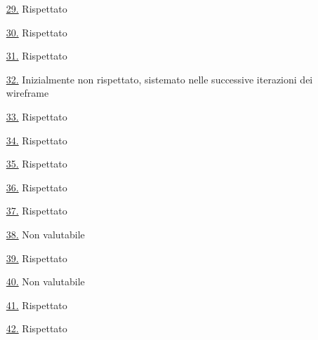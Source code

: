 \begin{itemize}
    \item[{\hyperref[lg:29]{29.}}] Rispettato
    \item[{\hyperref[lg:30]{30.}}] Rispettato
    \item[{\hyperref[lg:31]{31.}}] Rispettato
    \item[{\hyperref[lg:32]{32.}}] Inizialmente non rispettato, sistemato nelle successive iterazioni dei wireframe
    \item[{\hyperref[lg:33]{33.}}] Rispettato
    \item[{\hyperref[lg:34]{34.}}] Rispettato
    \item[{\hyperref[lg:35]{35.}}] Rispettato
    \item[{\hyperref[lg:36]{36.}}] Rispettato
    \item[{\hyperref[lg:37]{37.}}] Rispettato
    \item[{\hyperref[lg:38]{38.}}] Non valutabile
    \item[{\hyperref[lg:39]{39.}}] Rispettato
    \item[{\hyperref[lg:40]{40.}}] Non valutabile
    \item[{\hyperref[lg:41]{41.}}] Rispettato
    \item[{\hyperref[lg:42]{42.}}] Rispettato
\end{itemize}